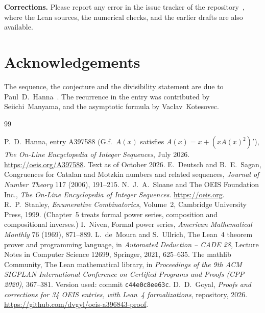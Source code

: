 \documentclass[11pt,a4paper]{article}
\theoremstyle{definition}
\theoremstyle{remark}
\newcommand{\para}[1]{\par\medskip\noindent\textbf{#1}\enspace}
\begin{document}
\para{Corrections.} Please report any error in the issue tracker of the repository~\cite{repo}, where the Lean
sources, the numerical checks, and the earlier drafts are also available.

\section*{Acknowledgements}
The sequence, the conjecture and the divisibility statement are due to Paul~D.~Hanna~\cite{oeis}. The recurrence in the
entry was contributed by Seiichi~Manyama, and the asymptotic formula by Vaclav~Kotesovec.

\begin{thebibliography}{99}\small
\raggedright
{} P.~D.~Hanna, entry A397588 (G.f.\ $A(x)$ satisfies $A(x)=x+(xA(x)^2)'$), \emph{The On-Line Encyclopedia of Integer Sequences}, July 2026. \url{https://oeis.org/A397588}. Text as of October 2026.
 E.~Deutsch and B.~E.~Sagan, Congruences for Catalan and Motzkin numbers and related sequences, \emph{Journal of Number Theory} 117 (2006), 191--215.
 N.~J.~A.~Sloane and The OEIS Foundation Inc., \emph{The On-Line Encyclopedia of Integer Sequences}. \url{https://oeis.org}.
 R.~P.~Stanley, \emph{Enumerative Combinatorics}, Volume~2, Cambridge University Press, 1999. (Chapter~5 treats formal power series, composition and compositional inverses.)
 I.~Niven, Formal power series, \emph{American Mathematical Monthly} 76 (1969), 871--889.
 L.~de~Moura and S.~Ullrich, The Lean~4 theorem prover and programming language, in \emph{Automated Deduction -- CADE 28}, Lecture Notes in Computer Science 12699, Springer, 2021, 625--635.
 The mathlib Community, The Lean mathematical library, in \emph{Proceedings of the 9th ACM SIGPLAN International Conference on Certified Programs and Proofs (CPP 2020)}, 367--381. Version used: commit \texttt{c44e0c8ee63c}.
 D.~D.~Goyal, \emph{Proofs and corrections for 34 OEIS entries, with Lean~4 formalizations}, repository, 2026. \url{https://github.com/dvgyl/oeis-a396843-proof}.
\end{thebibliography}
\end{document}
